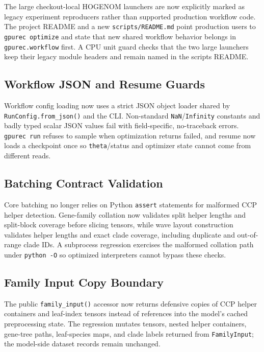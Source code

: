 \documentclass[11pt]{article}
\begin{document}
The large checkout-local HOGENOM launchers are now explicitly marked as legacy
experiment reproducers rather than supported production workflow code.  The
project README and a new \texttt{scripts/README.md} point production users to
\texttt{gpurec optimize} and state that new shared workflow behavior belongs in
\texttt{gpurec.workflow} first.  A CPU unit guard checks that the two large
launchers keep their legacy module headers and remain named in the scripts
README.

\subsection{Workflow JSON and Resume Guards}

Workflow config loading now uses a strict JSON object loader shared by
\texttt{RunConfig.from\_json()} and the CLI.  Non-standard
\texttt{NaN}/\texttt{Infinity} constants and badly typed scalar JSON values fail
with field-specific, no-traceback errors.  \texttt{gpurec run} refuses to sample
when optimization returns failed, and resume now loads a checkpoint once so
\texttt{theta}/status and optimizer state cannot come from different reads.

\subsection{Batching Contract Validation}

Core batching no longer relies on Python \texttt{assert} statements for malformed
CCP helper detection.  Gene-family collation now validates split helper lengths
and split-block coverage before slicing tensors, while wave layout construction
validates helper lengths and exact clade coverage, including duplicate and
out-of-range clade IDs.  A subprocess regression exercises the malformed
collation path under \texttt{python -O} so optimized interpreters cannot bypass
these checks.

\subsection{Family Input Copy Boundary}

The public \texttt{family\_input()} accessor now returns defensive copies of
CCP helper containers and leaf-index tensors instead of references into the
model's cached preprocessing state.  The regression mutates tensors, nested
helper containers, gene-tree paths, leaf-species maps, and clade labels returned
from \texttt{FamilyInput}; the model-side dataset records remain unchanged.
\end{document}
